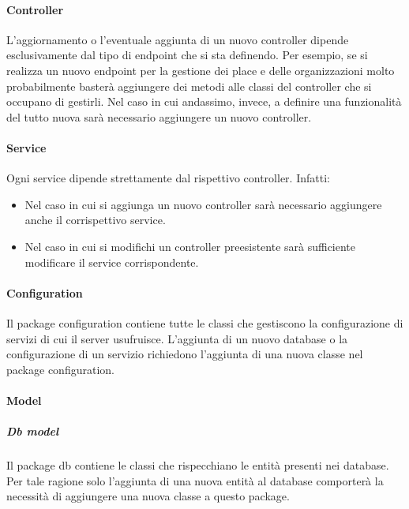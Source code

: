 \documentclass[../../manuale-manutentore.tex]{subfiles}
\begin{document}
\paragraph{Controller}%
\label{par:controller}

L'aggiornamento o l'eventuale aggiunta di un nuovo controller dipende esclusivamente dal tipo di endpoint che si sta definendo.
Per esempio, se si realizza un nuovo endpoint per la gestione dei place e delle organizzazioni molto probabilmente basterà aggiungere dei metodi alle classi del controller che si occupano di gestirli.
Nel caso in cui andassimo, invece, a definire una funzionalità del tutto nuova sarà necessario aggiungere un nuovo controller.

\paragraph{Service}%
\label{par:service}

Ogni service dipende strettamente dal rispettivo controller. Infatti:
\begin{itemize}
  \item Nel caso in cui si aggiunga un nuovo controller sarà necessario aggiungere anche il corrispettivo service.
  \item Nel caso in cui si modifichi un controller preesistente sarà sufficiente modificare il service corrispondente.
\end{itemize}

\paragraph{Configuration}%
\label{par:configuration}

Il package configuration contiene tutte le classi che gestiscono la configurazione di servizi di cui il server usufruisce.
L'aggiunta di un nuovo database o la configurazione di un servizio richiedono l'aggiunta di una nuova classe nel package configuration.

\paragraph{Model}%
\label{par:model}

\subparagraph{Db model}%
\label{subp:model}

Il package db contiene le classi che rispecchiano le entità presenti nei database.
Per tale ragione solo l'aggiunta di una nuova entità al database comporterà la necessità di aggiungere una nuova classe a questo package.
\end{document}
